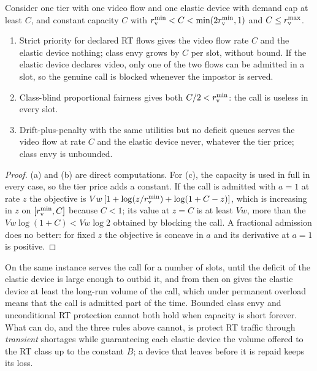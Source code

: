 \begin{proposition}\label{prop:baselines}
Consider one tier with one video flow and one elastic device with demand cap at least $C$, and constant capacity $C$ with $r^{\min}_{\mathrm{v}}<C<\min(2r^{\min}_{\mathrm{v}},1)$ and $C\le r^{\max}_{\mathrm{v}}$.
\begin{enumerate}[label=(\alph*),nosep]
\item Strict priority for declared RT flows gives the video flow rate $C$ and the elastic device nothing; class envy grows by $C$ per slot, without bound. If the elastic device declares video, only one of the two flows can be admitted in a slot, so the genuine call is blocked whenever the impostor is served.
\item Class-blind proportional fairness gives both $C/2<r^{\min}_{\mathrm{v}}$: the call is useless in every slot.
\item Drift-plus-penalty with the same utilities but no deficit queues serves the video flow at rate $C$ and the elastic device never, whatever the tier price; class envy is unbounded.
\end{enumerate}
\end{proposition}
\begin{proof}
(a) and (b) are direct computations. For (c), the capacity is used in full in every case, so the tier price adds a constant. If the call is admitted with $a=1$ at rate $z$ the objective is $Vw\,[1+\log(z/r^{\min}_{\mathrm{v}})+\log(1+C-z)]$, which is increasing in $z$ on $[r^{\min}_{\mathrm{v}},C]$ because $C<1$; its value at $z=C$ is at least $Vw$, more than the $Vw\log(1+C)<Vw\log 2$ obtained by blocking the call. A fractional admission does no better: for fixed $z$ the objective is concave in $a$ and its derivative at $a=1$ is positive.
\end{proof}

On the same instance \repay{} serves the call for a number of slots, until the deficit of the elastic device is large enough to outbid it, and from then on gives the elastic device at least the long-run volume of the call, which under permanent overload means that the call is admitted part of the time.
Bounded class envy and unconditional RT protection cannot both hold when capacity is short forever.
What \repay{} can do, and the three rules above cannot, is protect RT traffic through \emph{transient} shortages while guaranteeing each elastic device the volume offered to the RT class up to the constant $B$; a device that leaves before it is repaid keeps its loss.
